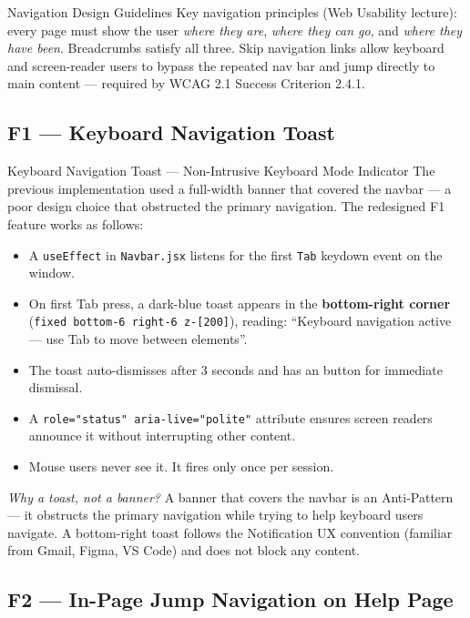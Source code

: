 \documentclass[12pt, a4paper]{article}
\begin{document}
\begin{hcibox}{Navigation Design Guidelines}
Key navigation principles (Web Usability lecture): every page must show the user \emph{where they are}, \emph{where they can go}, and \emph{where they have been}. Breadcrumbs satisfy all three. Skip navigation links allow keyboard and screen-reader users to bypass the repeated nav bar and jump directly to main content --- required by WCAG 2.1 Success Criterion 2.4.1.
\end{hcibox}\subsection{F1 --- Keyboard Navigation Toast}

\begin{featurebox}{Keyboard Navigation Toast --- Non-Intrusive Keyboard Mode Indicator}
The previous implementation used a full-width banner that covered the navbar --- a poor design choice that obstructed the primary navigation. The redesigned F1 feature works as follows:
\begin{itemize}[leftmargin=1.5em, itemsep=0pt]
  \item A \texttt{useEffect} in \texttt{Navbar.jsx} listens for the first \texttt{Tab} keydown event on the window.
  \item On first Tab press, a dark-blue toast appears in the \textbf{bottom-right corner} (\texttt{fixed bottom-6 right-6 z-[200]}), reading: ``Keyboard navigation active --- use Tab to move between elements''.
  \item The toast auto-dismisses after 3 seconds and has an \texttt{\texttimes} button for immediate dismissal.
  \item A \texttt{role="status" aria-live="polite"} attribute ensures screen readers announce it without interrupting other content.
  \item Mouse users never see it. It fires only once per session.
\end{itemize}

\textit{Why a toast, not a banner?} A banner that covers the navbar is an Anti-Pattern --- it obstructs the primary navigation while trying to help keyboard users navigate. A bottom-right toast follows the Notification UX convention (familiar from Gmail, Figma, VS Code) and does not block any content.
\end{featurebox}

\subsection{F2 --- In-Page Jump Navigation on Help Page}
\end{document}
